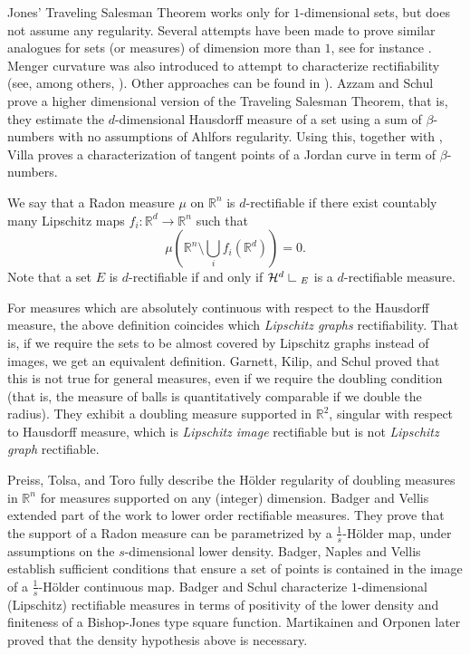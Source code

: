 \documentclass[11pt, twoside, leqno]{article}
\numberwithin{equation}{section}
\theoremstyle{plain}
\theoremstyle{definition}
\newcommand{\R}{\mathbb{R}}
\newcommand{\res}{\hbox{ {\vrule height .22cm}{\leaders\hrule\hskip.2cm} }} %
\begin{document}
Jones' Traveling Salesman Theorem works only for $1$-dimensional sets, but does not assume any regularity. Several attempts have been made to prove similar analogues for sets (or measures) of dimension more than $1$, see for instance \cite{pajot1,pajot2}. %
Menger curvature was also introduced to attempt to characterize rectifiability (see, among others, \cite{leger, lerman1, lerman2, polish, blatt, kola2, meurer, othermax, ghinassigoering2019}). Other approaches can be found in   \cite{jessica, delladio, santilli}). 
Azzam and Schul \cite{azzamschul} prove a higher dimensional version of the Traveling Salesman Theorem, that is, they estimate the $d$-dimensional Hausdorff measure of a set using a sum of $\beta$-numbers with no assumptions of Ahlfors regularity. Using this, together with \cite{davidtoro}, Villa \cite{michele} proves a characterization of tangent points of a Jordan curve in term of $\beta$-numbers.

We say that a Radon measure $\mu$ on $\R^n$ is $d$-rectifiable if there exist countably many Lipschitz maps $f_i \colon \R^d \to \R^n$ such that
\[
\mu\left(\R^n \setminus \bigcup_i f_i(\R^d)\right)=0.
\]
Note that a set $E$ is $d$-rectifiable if and only if $\mathcal{H}^d\res_E$ is a $d$-rectifiable measure.

For measures which are absolutely continuous with respect to the Hausdorff measure, the above definition coincides which \emph{Lipschitz graphs} rectifiability. That is, if we require the sets to be almost covered by Lipschitz graphs instead of images, we get an equivalent definition. Garnett, Kilip, and Schul   \cite{GKS} proved that this is not true for general measures, even if we require the doubling condition (that is, the measure of balls is quantitatively comparable if we double the radius). They exhibit a doubling measure supported in $\R^2$, singular with respect to Hausdorff measure, which is \emph{Lipschitz image} rectifiable but is not \emph{Lipschitz graph} rectifiable. 

Preiss, Tolsa, and Toro   \cite{PTT} fully describe the H\"{o}lder regularity of doubling measures in $\R^n$ for measures supported on any (integer) dimension. Badger and Vellis \cite{matt} extended part of the work to lower order rectifiable measures.  They prove that the support of a Radon measure can be parametrized by a $\frac{1}{s}$-H\"{o}lder map, under assumptions on the $s$-dimensional lower density. Badger, Naples and Vellis \cite{mattlisavyron} establish sufficient conditions that ensure a set of points is contained in the image of a $\frac{1}{s}$-H\"older continuous map. Badger and Schul \cite{raananmatt1, raananmatt2} characterize $1$-dimensional (Lipschitz) rectifiable measures in terms of positivity of the lower density and finiteness of a Bishop-Jones type square function. Martikainen and Orponen \cite{orponen} later proved that the density hypothesis above is necessary.
\end{document}
